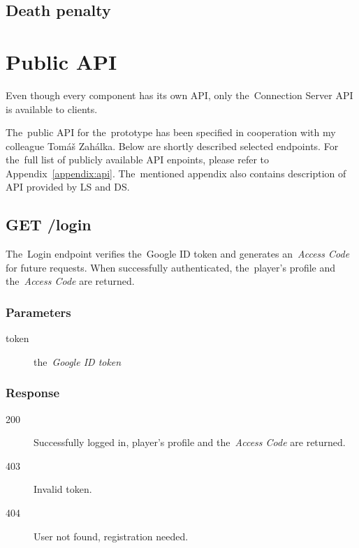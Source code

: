 	\subsection{Death penalty}

\section{Public API}
Even though every component has its own API, only the~Connection Server API is available to clients. 

The~public API for the~prototype has been specified in cooperation with my colleague Tomáš Zahálka. Below are shortly described selected endpoints. For the~full list of publicly available API enpoints, please refer to Appendix~\ref{appendix:api}. The~mentioned appendix also contains description of API provided by LS and DS. 	

\subsection{GET /login}

The~Login endpoint verifies the~Google ID token and generates an~\textit{Access Code} for future requests. When successfully authenticated, the~player's profile and the~\textit{Access Code} are returned.

\subsubsection*{Parameters}

\begin{description}

	\item[token] the~\textit{Google ID token}

\end{description}

\subsubsection*{Response}

\begin{description}

	\item[200] Successfully logged in, player's profile and the~\textit{Access Code} are returned.

	\item[403] Invalid token.

	\item[404] User not found, registration needed.

\end{description}

